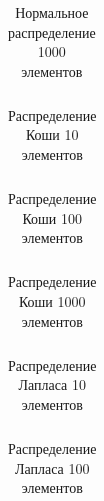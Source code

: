 \documentclass[a4paper]{article}
\begin{document}
         \begin{table}[H]
            \centering
            \begin{tabular}{|c|c|c|c|c|c|}
                \hline
                
            \end{tabular}
            \caption{Нормальное распределение 1000 элементов}
            \label{tab:norm_1000}
        \end{table}

        \begin{table}[H]
            \centering
            \begin{tabular}{|c|c|c|c|c|c|}
                \hline
                
            \end{tabular}
            \caption{Распределение Коши 10 элементов}
            \label{tab:cauchy_10}
        \end{table}

        \begin{table}[H]
            \centering
            \begin{tabular}{|c|c|c|c|c|c|}
                \hline
                
            \end{tabular}
            \caption{Распределение Коши 100 элементов}
            \label{tab:cauchy_100}
        \end{table}

        \begin{table}[H]
            \centering
            \begin{tabular}{|c|c|c|c|c|c|}
                \hline
                
            \end{tabular}
            \caption{Распределение Коши 1000 элементов}
            \label{tab:cauchy_1000}
        \end{table}

        \begin{table}[H]
            \centering
            \begin{tabular}{|c|c|c|c|c|c|}
                \hline
                
            \end{tabular}
            \caption{Распределение Лапласа 10 элементов}
            \label{tab:laplace_10}
        \end{table}

        \begin{table}[H]
            \centering
            \begin{tabular}{|c|c|c|c|c|c|}
                \hline
                
            \end{tabular}
            \caption{Распределение Лапласа 100 элементов}
            \label{tab:laplace_100}
        \end{table}
\end{document}
